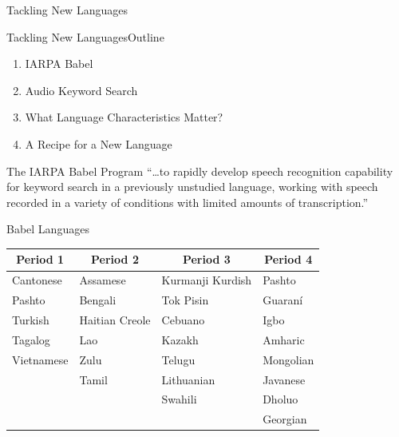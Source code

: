 \begin{frame}
  \begin{center}
    {\color{Maroon}\Huge Tackling New Languages}
  \end{center}
\end{frame}

\begin{frame}{Tackling New Languages}{Outline}
  \begin{enumerate}
  \item IARPA Babel
  \item Audio Keyword Search
  \item What Language Characteristics Matter?
  \item A Recipe for a New Language
  \end{enumerate}
\end{frame}

\begin{frame}{The IARPA Babel Program}{}
  \Large{``\ldots to rapidly develop speech recognition
    capability for keyword search in a previously unstudied
    language, working with speech recorded in a variety of
    conditions with limited amounts of transcription.''}\par
\end{frame}

\begin{frame}{Babel Languages}{}
  \begin{center}
  \begin{tabular}{@{}llll@{}} \toprule
    \multicolumn{1}{c}{\bf Period 1} & \multicolumn{1}{c}{\bf Period 2} & \multicolumn{1}{c}{\bf Period 3} & \multicolumn{1}{c}{\bf Period 4} \\ \midrule
    Cantonese  & Assamese       & Kurmanji Kurdish & {\color{Maroon}Pashto} \\
    {\color{Maroon}Pashto}     & Bengali        & Tok Pisin        & Guaran\'{i} \\
    Turkish    & Haitian Creole & Cebuano          & Igbo \\
    Tagalog    & Lao            & Kazakh           & Amharic \\
    {\color{DarkerBlue}Vietnamese} & Zulu           & Telugu           & Mongolian \\
               & {\color{DarkerBlue}Tamil}          & Lithuanian       & Javanese \\
               &                & {\color{DarkerBlue}Swahili}          & Dholuo \\
               &                &                  & {\color{DarkerBlue}Georgian} \\ \bottomrule
  \end{tabular}
  \end{center}
  \vfill
\end{frame}

